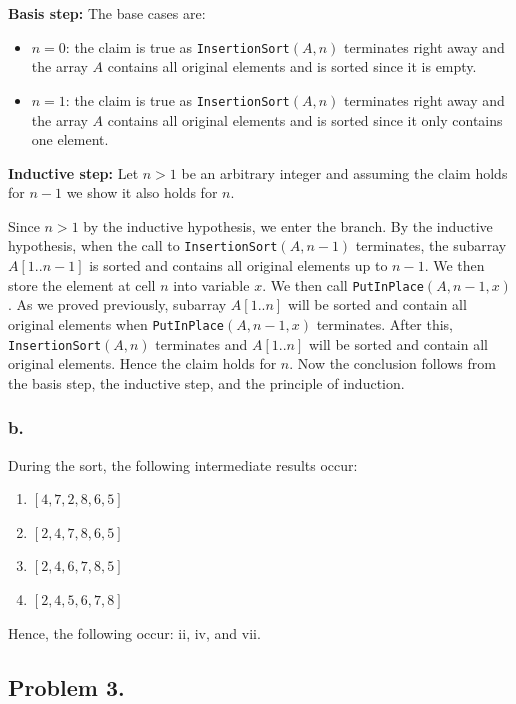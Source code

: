 \documentclass[11pt, letterpaper, titlepage]{article}
\begin{document}
\begin{itemize}
    \textbf{Basis step:} The base cases are:
    \begin{itemize}
        \item $n = 0$: the claim is true as \lstinline{InsertionSort}$(A,n)$ terminates right away and the array $A$ contains all original elements and is sorted since it is empty.
        \item $n = 1$: the claim is true as \lstinline{InsertionSort}$(A,n)$ terminates right away and the array $A$ contains all original elements and is sorted since it only contains one element.
    \end{itemize}

    \textbf{Inductive step:} Let $n > 1$ be an arbitrary integer and assuming the claim holds for $n - 1$ we show it also holds for $n$. 
    
    Since $n > 1$ by the inductive hypothesis, we enter the branch. By the inductive hypothesis, when the call to \lstinline{InsertionSort}$(A,n-1)$ terminates, the subarray $A[1..n-1]$ is sorted and contains all original elements up to $n - 1$. We then store the element at cell $n$ into variable $x$. We then call \lstinline{PutInPlace}$(A,n-1,x)$. As we proved previously, subarray $A[1..n]$ will be sorted and contain all original elements when \lstinline{PutInPlace}$(A,n-1,x)$ terminates. After this, \lstinline{InsertionSort}$(A,n)$ terminates and $A[1..n]$ will be sorted and contain all original elements. Hence the claim holds for $n$. Now the conclusion follows from the basis step, the inductive step, and the principle of induction.
\end{itemize}

\subsubsection*{b.}
During the sort, the following intermediate results occur:
\begin{enumerate}
    \item $[4, 7, 2, 8, 6, 5]$
    \item $[2, 4, 7, 8, 6, 5]$
    \item $[2, 4, 6, 7, 8, 5]$
    \item $[2, 4, 5, 6, 7, 8]$
\end{enumerate}

Hence, the following occur: ii, iv, and vii.

\newpage
\subsection*{Problem 3.}
\end{document}
